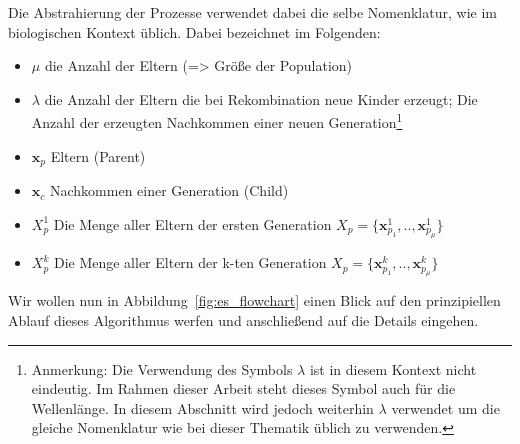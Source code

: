 Die Abstrahierung der Prozesse verwendet dabei die selbe Nomenklatur, wie im biologischen Kontext üblich. Dabei bezeichnet im Folgenden:
%
\begin{itemize} [itemsep=1mm]
	\item $\mu$ die Anzahl der Eltern (=> Größe der Population)
	\item $\lambda$ die Anzahl der Eltern die bei Rekombination neue Kinder erzeugt; Die Anzahl der erzeugten Nachkommen einer neuen Generation\footnote{Anmerkung: Die Verwendung des Symbols $\lambda$ ist in diesem Kontext nicht eindeutig. Im Rahmen dieser Arbeit steht dieses Symbol auch für die Wellenlänge. In diesem Abschnitt wird jedoch weiterhin $\lambda$ verwendet um die gleiche Nomenklatur wie bei dieser Thematik üblich zu verwenden.}
	\item $\mathbf{x}_p$ Eltern (Parent)
	\item $\mathbf{x}_c$ Nachkommen einer Generation (Child)
	\item $X_p^1$ Die Menge aller Eltern der ersten Generation $X_p = \{\mathbf{x}_{p_1}^1,..,\mathbf{x}_{p_\mu}^1\}$
	\item $X_p^k$ Die Menge aller Eltern der k-ten Generation $X_p = \{\mathbf{x}_{p_1}^k,..,\mathbf{x}_{p_\mu}^k\}$
\end{itemize}
%
Wir wollen nun in Abbildung~\ref{fig:es_flowchart} einen Blick auf den prinzipiellen Ablauf dieses Algorithmus werfen und anschließend auf die Details eingehen.
%

%

